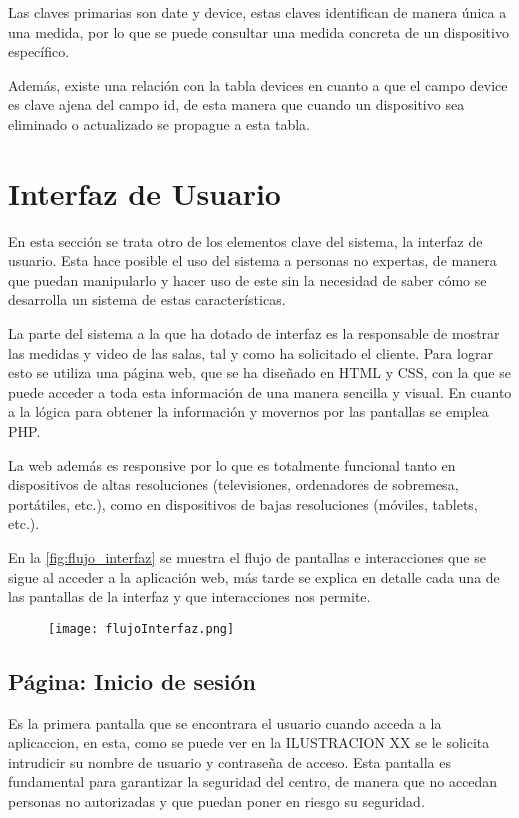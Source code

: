 Las claves primarias son date y device, estas claves identifican de manera única a una medida, por lo que se puede consultar una medida concreta de un dispositivo específico.

Además, existe una relación con la tabla devices en cuanto a que el campo device es clave ajena del campo id, de esta manera que cuando un dispositivo sea eliminado o actualizado se propague a esta tabla.

\section{Interfaz de Usuario}\label{sec:interfaz}
En esta sección se trata otro de los elementos clave del sistema, la interfaz de usuario. Esta hace posible el uso del sistema a personas no expertas, de manera que puedan manipularlo y hacer uso de este sin la necesidad de saber cómo se desarrolla un sistema de estas características.

La parte del sistema a la que ha dotado de interfaz es la responsable de mostrar las medidas y video de las salas, tal y como ha solicitado el cliente. Para lograr esto se utiliza una página web, que se ha diseñado en HTML y CSS, con la que se puede acceder a toda esta información de una manera sencilla y visual. En cuanto a la lógica para obtener la información y movernos por las pantallas se emplea PHP.

La web además es responsive por lo que es totalmente funcional tanto en dispositivos de altas resoluciones (televisiones, ordenadores de sobremesa, portátiles, etc.), como en dispositivos de bajas resoluciones (móviles, tablets, etc.).

En la \autoref{fig:flujo_interfaz} se muestra el flujo de pantallas e interacciones que se sigue al acceder a la aplicación web, más tarde se explica en detalle cada una de las pantallas de la interfaz y que interacciones nos permite.
\begin{figure}[H]
	{\texttt{[image: flujoInterfaz.png]}}
\end{figure}

\subsection{Página: Inicio de sesión}
Es la primera pantalla que se encontrara el usuario cuando acceda a la aplicaccion, en esta, como se puede ver en la ILUSTRACION XX se le solicita intrudicir su nombre  de usuario y contraseña de acceso. Esta pantalla es fundamental para garantizar la seguridad del centro, de manera que no accedan personas no autorizadas y que puedan poner en riesgo su seguridad.

